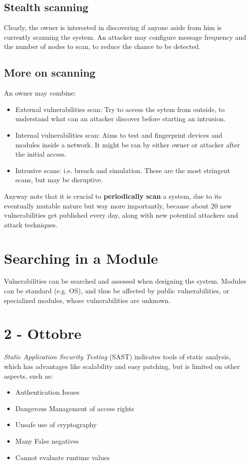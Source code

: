 \subsection{Stealth scanning}
Clearly, the owner is interested in discovering if anyone aside from him is currently scanning the system.
An attacker may configure message frequency and the number of nodes to scan, to reduce the chance to be detected.

\subsection{More on scanning}
An owner may combine:
\begin{itemize}
    \item External vulnerabilities scan: Try to access the sytem from outside, to understand what can an attacker discover before starting an intrusion.
    \item Internal vulnerabilities scan: Aims to test and fingerprint devices and modules inside a network.
    It might be ran by either owner or attacker after the initial access.
    \item Intrusive scans: i.e. breach and simulation. These are the most stringent scans, but may be disruptive.
\end{itemize}

Anyway note that it is crucial to \textbf{periodically scan} a system, due to its eventually mutable nature but way more importantly, because about 20 new vulnerabilities get published every day, 
along with new potential attackers and attack techniques.

\section{Searching in a Module}
Vulnerabilities can be searched and assessed when designing the system.
Modules can be standard (e.g. OS), and thus be affected by public vulnerabilities, or specialized modules, whose vulnerabilities are unknown.

\section*{2 - Ottobre}

\textit{Static Application Security Testing} (SAST) indicates tools of static analysis, which has advantages like scalability and easy patching,
but is limited on other aspects, such as:
\begin{itemize}
    \item Authentication Issues
    \item Dangerous Management of access rights
    \item Unsafe use of cryptography
    \item Many False negatives
    \item Cannot evaluate runtime values
\end{itemize}

